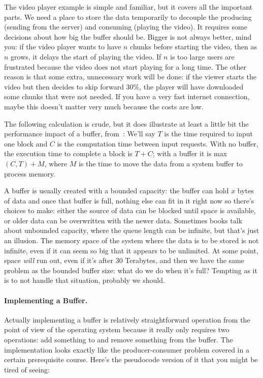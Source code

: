 The video player example is simple and familiar, but it covers all the important parts. We need a place to store the data temporarily to decouple the producing (sending from the server) and consuming (playing the video). It requires some decisions about how big the buffer should be. Bigger is not always better, mind you: if the video player wants to have $n$ chunks before starting the video, then as $n$ grows, it delays the start of playing the video. If $n$ is too large users are frustrated because the video does not start playing for a long time. The other reason is that some extra, unnecessary work will be done: if the viewer starts the video but then decides to skip forward 30\%, the player will have downloaded some chunks that were not needed. If you have a very fast internet connection, maybe this doesn't matter very much because the costs are low.

The following calculation is crude, but it does illustrate at least a little bit the performance impact of a buffer, from~\cite{osi}: We'll say $T$ is the time required to input one block and $C$ is the computation time between input requests. With no buffer, the execution time to complete a block is $T+C$; with a buffer it is max$(C, T) + M$, where $M$ is the time to move the data from a system buffer to process memory.

A buffer is usually created with a bounded capacity: the buffer can hold $x$ bytes of data and once that buffer is full, nothing else can fit in it right now so there's choices to make: either the source of data can be blocked until space is available, or older data can be overwritten with the newer data. Sometimes books talk about unbounded capacity, where the queue length can be infinite, but that's just an illusion. The memory space of the system where the data is to be stored is not infinite, even if it can seem so big that it appears to be unlimited. At some point, space \textit{will} run out, even if it's after 30 Terabytes, and then we have the same problem as the bounded buffer size: what do we do when it's full? Tempting as it is to not handle that situation, probably we should.

\paragraph{Implementing a Buffer.}
Actually implementing a buffer is relatively straightforward operation from the point of view of the operating system because it really only requires two operations: add something to and remove something from the buffer. The implementation looks exactly like the producer-consumer problem covered in a certain prerequisite course. Here's the pseudocode version of it that you might be tired of seeing:


